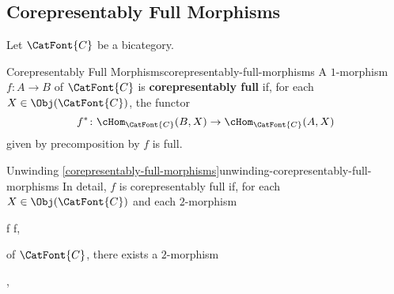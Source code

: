 \subsection{Corepresentably Full Morphisms}\label{subsection-corepresentably-full-morphisms}
Let $\CatFont{C}$ be a bicategory.
\begin{definition}{Corepresentably Full Morphisms}{corepresentably-full-morphisms}%
    A $1$-morphism $f\colon A\to B$ of $\CatFont{C}$ is \textbf{corepresentably full} if, for each $X\in\Obj(\CatFont{C})$, the functor
    \[
        f^{*}%
        \colon%
        \cHom_{\CatFont{C}}(B,X)%
        \to%
        \cHom_{\CatFont{C}}(A,X)%
    \]%
    given by precomposition by $f$ is full.
\end{definition}
\begin{remark}{Unwinding \cref{corepresentably-full-morphisms}}{unwinding-corepresentably-full-morphisms}%
    In detail, $f$ is corepresentably full if, for each $X\in\Obj(\CatFont{C})$ and each $2$-morphism
    \begin{webcompile}
        \beta%
        \colon%
        \phi\circ f%
        \Longrightarrow%
        \psi\circ f,%
        \quad%
    \end{webcompile}
    of $\CatFont{C}$, there exists a $2$-morphism
    \begin{webcompile}
        \alpha%
        \colon%
        \phi%
        \Longrightarrow%
        \psi,%
        \quad%
    \end{webcompile}

\end{remark}
